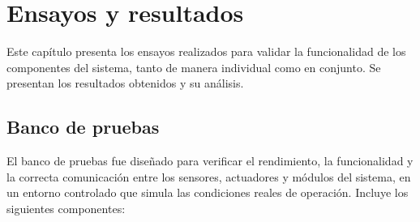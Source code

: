 \chapter{Ensayos y resultados} %

\label{Chapter4}

Este capítulo presenta los ensayos realizados para validar la funcionalidad de
los componentes del sistema, tanto de manera individual como en conjunto. Se
presentan los resultados obtenidos y su análisis.

\section{Banco de pruebas}

El banco de pruebas fue diseñado para verificar el rendimiento, la
funcionalidad y la correcta comunicación entre los sensores, actuadores y
módulos del sistema, en un entorno controlado que simula las condiciones reales
de operación. Incluye los siguientes componentes:

